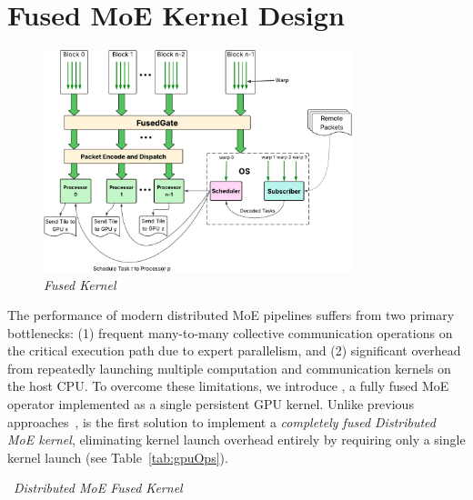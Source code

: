 \section{Fused MoE Kernel Design}\label{sec:method}
\begin{figure}[!ht]
    \centering
    \includegraphics[width=0.8\textwidth, keepaspectratio]{figures/architecture}
    \caption{\emph{\sysname Fused Kernel}}
    \label{fig:fusedK}
\end{figure}
The performance of modern distributed MoE pipelines suffers from two primary bottlenecks: (1) frequent many-to-many
collective communication operations on the critical execution path due to expert parallelism, and (2) significant overhead from repeatedly launching multiple computation and communication kernels on the host CPU. To overcome these limitations, we introduce \sysname, a fully fused MoE operator implemented as a single persistent GPU kernel. Unlike previous approaches~\cite{comet, deepep, pmlr-v162-rajbhandari22a, megatron, MLSYS2023_5616d34c, MLSYS2024_339caf45, 10.1145/3503221.3508418, 10.1145/3588964, 10.1145/3627703.3650083, 10.1145/3710848.3710868, NEURIPS2022_67d57c32}, \sysname is the first solution to implement a \emph{completely fused Distributed MoE kernel}, eliminating kernel launch overhead entirely by requiring only a single kernel launch (see Table~\ref{tab:gpuOps}).
\begin{algorithm}[!h]
    \small
    \DontPrintSemicolon
    \caption{~\emph{\sysname Distributed MoE Fused Kernel}}\label{alg:one}
\end{algorithm}

